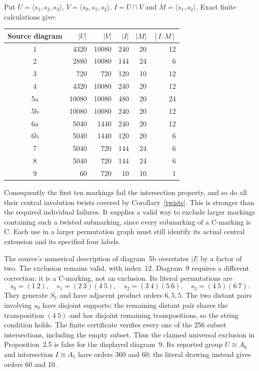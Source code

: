 \documentclass[a4paper,11pt]{article}
\newcommand{\gen}[1]{\langle#1\rangle}
\begin{document}
Put $U=\gen{s_1,s_2,s_3}$, $V=\gen{s_0,s_1,s_2}$,
$I=U\cap V$ and $M=\gen{s_1,s_2}$. Exact finite calculations give:
\begin{center}
\begin{tabular}{crrrrr}
\toprule
Source diagram&$|U|$&$|V|$&$|I|$&$|M|$&$[I:M]$\\
\midrule
1&4320&10080&240&20&12\\
2&2880&10080&144&24&6\\
3&720&720&120&10&12\\
4&4320&10080&240&20&12\\
5a&10080&10080&480&20&24\\
5b&10080&10080&240&20&12\\
6a&5040&1440&240&20&12\\
6b&5040&1440&120&20&6\\
7&5040&720&144&24&6\\
8&5040&720&144&24&6\\
9&60&720&10&10&1\\
\bottomrule
\end{tabular}
\end{center}
Consequently the first ten markings fail the intersection property, and
so do all their central involution twists covered by
Corollary~\ref{twists}. This is stronger than the required individual
failures. It supplies a valid way to exclude larger markings containing
such a twisted submarking, since every submarking of a C-marking is C.
Each use in a larger permutation graph must still identify its actual
central extension and its specified four labels.

The source's numerical description of diagram~5b overstates $|I|$ by a
factor of two. The exclusion remains valid, with index~12. Diagram~9
requires a different correction: it is a C-marking, not an exclusion.
Its literal permutations are
\[
 s_0=(1\ 2),\quad s_1=(2\ 3)(4\ 5),\quad
 s_2=(3\ 4)(5\ 6),\quad s_3=(4\ 5)(6\ 7).
\]
They generate $S_7$ and have adjacent product orders $6,5,5$.
The two distant pairs involving $s_0$ have disjoint supports; the
remaining distant pair shares the transposition $(4\ 5)$ and has
disjoint remaining transpositions, so the string condition holds.
The finite certificate verifies every one of the 256 subset intersections,
including the empty subset. Thus the claimed universal exclusion in
Proposition~2.5 is false for the displayed diagram~9. Its reported
group $U\cong A_6$ and intersection $I\cong A_5$ have orders 360
and 60; the literal drawing instead gives orders 60 and 10.
\end{document}
